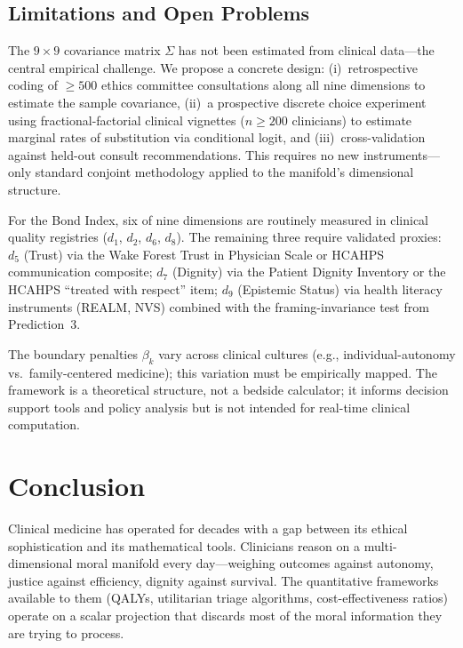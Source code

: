 \documentclass[12pt]{article}
\theoremstyle{definition}
\theoremstyle{remark}
\begin{document}
\subsection{Limitations and Open Problems}

The $9 \times 9$ covariance matrix $\Sigma$ has not been estimated from clinical data---the central empirical challenge.  We propose a concrete design: (i)~retrospective coding of $\geq 500$ ethics committee consultations along all nine dimensions to estimate the sample covariance, (ii)~a prospective discrete choice experiment using fractional-factorial clinical vignettes ($n \geq 200$ clinicians) to estimate marginal rates of substitution via conditional logit, and (iii)~cross-validation against held-out consult recommendations.  This requires no new instruments---only standard conjoint methodology applied to the manifold's dimensional structure.

For the Bond Index, six of nine dimensions are routinely measured in clinical quality registries ($d_1$, $d_2$, $d_6$, $d_8$).  The remaining three require validated proxies: $d_5$ (Trust) via the Wake Forest Trust in Physician Scale or HCAHPS communication composite; $d_7$ (Dignity) via the Patient Dignity Inventory \cite{chochinov2008} or the HCAHPS ``treated with respect'' item; $d_9$ (Epistemic Status) via health literacy instruments (REALM, NVS) combined with the framing-invariance test from Prediction~3.

The boundary penalties $\beta_k$ vary across clinical cultures (e.g., individual-autonomy vs.\ family-centered medicine); this variation must be empirically mapped.  The framework is a theoretical structure, not a bedside calculator; it informs decision support tools and policy analysis but is not intended for real-time clinical computation.


\section{Conclusion}
\label{sec:conclusion}

Clinical medicine has operated for decades with a gap between its ethical sophistication and its mathematical tools.  Clinicians reason on a multi-dimensional moral manifold every day---weighing outcomes against autonomy, justice against efficiency, dignity against survival.  The quantitative frameworks available to them (QALYs, utilitarian triage algorithms, cost-effectiveness ratios) operate on a scalar projection that discards most of the moral information they are trying to process.
\end{document}
